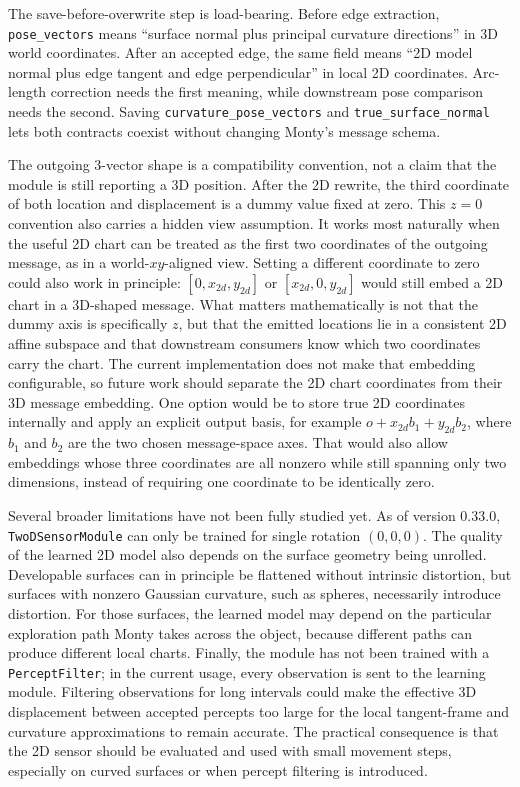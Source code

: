 \documentclass{article}
\begin{document}
The save-before-overwrite step is load-bearing.
Before edge extraction, \texttt{pose\_vectors} means ``surface normal plus principal curvature directions'' in 3D world coordinates.
After an accepted edge, the same field means ``2D model normal plus edge tangent and edge perpendicular'' in local 2D coordinates.
Arc-length correction needs the first meaning, while downstream pose comparison needs the second.
Saving \texttt{curvature\_pose\_vectors} and \texttt{true\_surface\_normal} lets both contracts coexist without changing Monty's message schema.

The outgoing 3-vector shape is a compatibility convention, not a claim that the module is still reporting a 3D position.
After the 2D rewrite, the third coordinate of both location and displacement is a dummy value fixed at zero.
This \(z=0\) convention also carries a hidden view assumption.
It works most naturally when the useful 2D chart can be treated as the first two coordinates of the outgoing message, as in a world-\(xy\)-aligned view.
Setting a different coordinate to zero could also work in principle: \([0, x_{2d}, y_{2d}]\) or \([x_{2d}, 0, y_{2d}]\) would still embed a 2D chart in a 3D-shaped message.
What matters mathematically is not that the dummy axis is specifically \(z\), but that the emitted locations lie in a consistent 2D affine subspace and that downstream consumers know which two coordinates carry the chart.
The current implementation does not make that embedding configurable, so future work should separate the 2D chart coordinates from their 3D message embedding.
One option would be to store true 2D coordinates internally and apply an explicit output basis, for example \(o + x_{2d} b_1 + y_{2d} b_2\), where \(b_1\) and \(b_2\) are the two chosen message-space axes.
That would also allow embeddings whose three coordinates are all nonzero while still spanning only two dimensions, instead of requiring one coordinate to be identically zero.

Several broader limitations have not been fully studied yet.
As of version 0.33.0, \texttt{TwoDSensorModule} can only be trained for single rotation \((0, 0, 0)\).
The quality of the learned 2D model also depends on the surface geometry being unrolled.
Developable surfaces can in principle be flattened without intrinsic distortion, but surfaces with nonzero Gaussian curvature, such as spheres, necessarily introduce distortion.
For those surfaces, the learned model may depend on the particular exploration path Monty takes across the object, because different paths can produce different local charts.
Finally, the module has not been trained with a \texttt{PerceptFilter}; in the current usage, every observation is sent to the learning module.
Filtering observations for long intervals could make the effective 3D displacement between accepted percepts too large for the local tangent-frame and curvature approximations to remain accurate.
The practical consequence is that the 2D sensor should be evaluated and used with small movement steps, especially on curved surfaces or when percept filtering is introduced.


\end{document}
